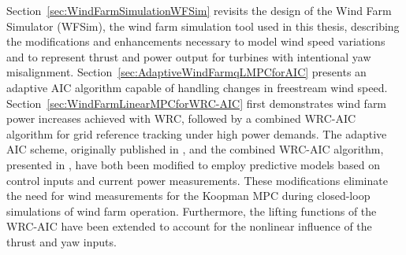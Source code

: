 Section~\ref{sec:WindFarmSimulationWFSim} revisits the design of the Wind Farm Simulator (WFSim), the wind farm simulation tool used in this thesis, describing the modifications and enhancements necessary to model wind speed variations and to represent thrust and power output for turbines with intentional yaw misalignment. Section~\ref{sec:AdaptiveWindFarmqLMPCforAIC} presents an adaptive AIC algorithm capable of handling changes in freestream wind speed. Section~\ref{sec:WindFarmLinearMPCforWRC-AIC} first demonstrates wind farm power increases achieved with WRC, followed by a combined WRC-AIC algorithm for grid reference tracking under high power demands. The adaptive AIC scheme, originally published in \cite{dittmer2022data}, and the combined WRC-AIC algorithm, presented in \cite{dittmer2023koopman}, have both been modified to employ predictive models based on control inputs and current power measurements. These modifications eliminate the need for wind measurements for the Koopman MPC during closed-loop simulations of wind farm operation. Furthermore, the lifting functions of the WRC-AIC have been extended to account for the nonlinear influence of the thrust and yaw inputs.

